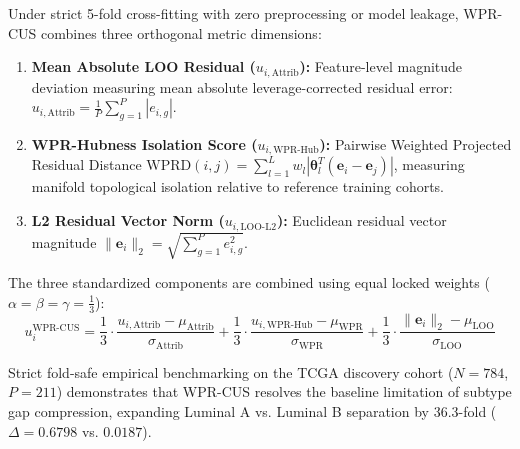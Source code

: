 \documentclass[10pt,a4paper,twocolumn]{article}
\begin{document}
Under strict 5-fold cross-fitting with zero preprocessing or model leakage, WPR-CUS combines three orthogonal metric dimensions:

\begin{enumerate}
    \item \textbf{Mean Absolute LOO Residual ($u_{i, \text{Attrib}}$):} Feature-level magnitude deviation measuring mean absolute leverage-corrected residual error: $u_{i, \text{Attrib}} = \frac{1}{P} \sum_{g=1}^P |e_{i,g}|$.
    \item \textbf{WPR-Hubness Isolation Score ($u_{i, \text{WPR-Hub}}$):} Pairwise Weighted Projected Residual Distance $\text{WPRD}(i, j) = \sum_{l=1}^L w_l \left| \boldsymbol{\theta}_l^T (\mathbf{e}_i - \mathbf{e}_j) \right|$, measuring manifold topological isolation relative to reference training cohorts.
    \item \textbf{L2 Residual Vector Norm ($u_{i, \text{LOO-L2}}$):} Euclidean residual vector magnitude $\|\mathbf{e}_i\|_2 = \sqrt{\sum_{g=1}^P e_{i,g}^2}$.
\end{enumerate}

The three standardized components are combined using equal locked weights ($\alpha = \beta = \gamma = \frac{1}{3}$):
\begin{equation}
u_i^{\text{WPR-CUS}} = \frac{1}{3} \cdot \frac{u_{i, \text{Attrib}} - \mu_{\text{Attrib}}}{\sigma_{\text{Attrib}}} + \frac{1}{3} \cdot \frac{u_{i, \text{WPR-Hub}} - \mu_{\text{WPR}}}{\sigma_{\text{WPR}}} + \frac{1}{3} \cdot \frac{\|\mathbf{e}_i\|_2 - \mu_{\text{LOO}}}{\sigma_{\text{LOO}}}
\end{equation}

Strict fold-safe empirical benchmarking on the TCGA discovery cohort ($N=784$, $P=211$) demonstrates that WPR-CUS resolves the baseline limitation of subtype gap compression, expanding Luminal A vs. Luminal B separation by 36.3-fold ($\Delta = 0.6798$ vs. $0.0187$).
\end{document}
